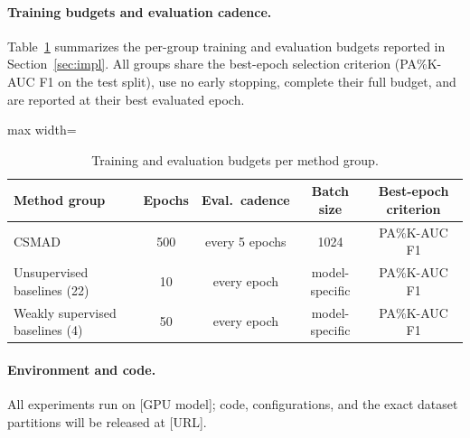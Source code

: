 \paragraph{Training budgets and evaluation cadence.}
Table~\ref{tab:budgets} summarizes the per-group training and evaluation budgets reported in
Section~\ref{sec:impl}.
All groups share the best-epoch selection criterion (PA\%K-AUC F1 on the test split), use no
early stopping, complete their full budget, and are reported at their best evaluated epoch.

\begin{table}[tp]
\footnotesize
\centering
\caption{Training and evaluation budgets per method group.}
\label{tab:budgets}
\begin{adjustbox}{max width=\linewidth}
\begin{tabular}{lcccc}
\toprule
Method group & Epochs & Eval.\ cadence & Batch size & Best-epoch criterion \\
\midrule
CSMAD                          & 500 & every 5 epochs & 1024 & PA\%K-AUC F1 \\
Unsupervised baselines (22)    & 10  & every epoch & model-specific & PA\%K-AUC F1 \\
Weakly supervised baselines (4)& 50  & every epoch & model-specific & PA\%K-AUC F1 \\
\bottomrule
\end{tabular}
\end{adjustbox}
\end{table}

\paragraph{Environment and code.}
All experiments run on [GPU model]; %
code, configurations, and the exact dataset partitions will be released at [URL].

